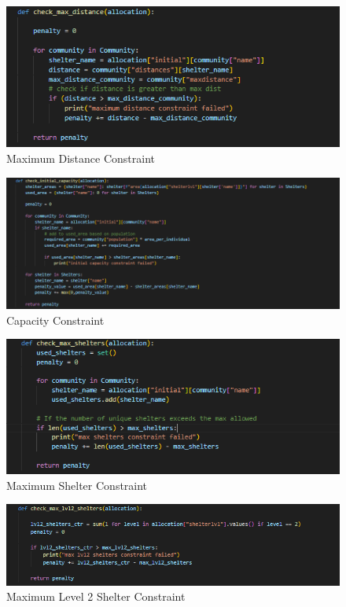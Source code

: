 \begin{appendices}
\begin{centerappendixtitle}
		\begin{figure}[h]
			\centering
			\caption{Maximum Distance Constraint}
			\label{maxdistCode}
			\includegraphics[width=\linewidth]{appendix/dist const}
		\end{figure}
		
		\begin{figure}[h]
			\centering
			\caption{Capacity Constraint}
			\label{capCode}
			\includegraphics[width=\linewidth]{appendix/capacity const}
		\end{figure}
		
		\begin{figure}[h]
			\centering
			\caption{Maximum Shelter Constraint}
			\label{maxshelCode}
			\includegraphics[width=\linewidth]{appendix/max shel const}
		\end{figure}
		
		\begin{figure}[h]
			\centering
			\caption{Maximum Level 2 Shelter Constraint}
			\label{maxl2shelCode}
			\includegraphics[width=\linewidth]{appendix/max lvl2 shel const}
		\end{figure}
		

\end{centerappendixtitle}
\end{appendices}
